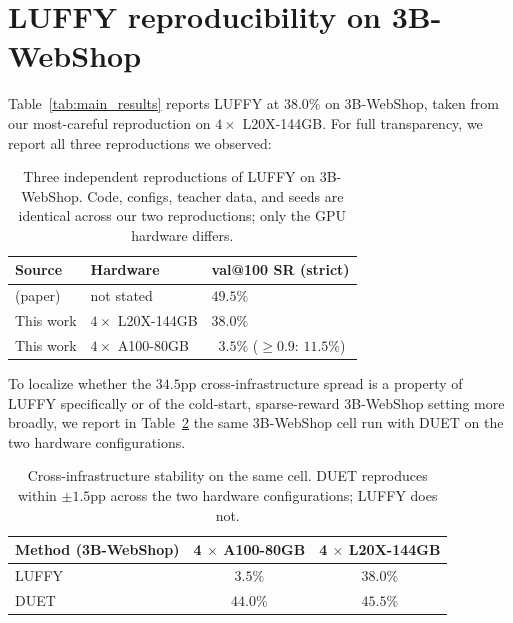 
\section{LUFFY reproducibility on 3B-WebShop}
\label{app:luffy_repro}

Table~\ref{tab:main_results} reports LUFFY at $38.0\%$ on 3B-WebShop, taken from our most-careful reproduction on $4 \times$ L20X-144GB. For full transparency, we report all three reproductions we observed:

\begin{table}[h]
\centering
\small
\begin{tabular}{lll}
\toprule
\textbf{Source} & \textbf{Hardware} & \textbf{val@100 SR (strict)} \\
\midrule
\citet{yan2025luffy} (paper)        & not stated            & $49.5\%$  \\
This work                           & $4 \times$ L20X-144GB & $38.0\%$  \\
This work                           & $4 \times$ A100-80GB  & $\phantom{0}3.5\%$ ($\geq 0.9$: $11.5\%$) \\
\bottomrule
\end{tabular}
\caption{Three independent reproductions of LUFFY on 3B-WebShop. Code, configs, teacher data, and seeds are identical across our two reproductions; only the GPU hardware differs.}
\label{tab:luffy_3way}
\end{table}

To localize whether the $34.5$pp cross-infrastructure spread is a property of LUFFY specifically or of the cold-start, sparse-reward 3B-WebShop setting more broadly, we report in Table~\ref{tab:cross_infra} the same 3B-WebShop cell run with DUET on the two hardware configurations.

\begin{table}[h]
\centering
\small
\begin{tabular}{lcc}
\toprule
\textbf{Method (3B-WebShop)} & \textbf{4 $\times$ A100-80GB} & \textbf{4 $\times$ L20X-144GB} \\
\midrule
LUFFY & \phantom{0}$3.5\%$ & $38.0\%$ \\
DUET  &           $44.0\%$ & $45.5\%$ \\
\bottomrule
\end{tabular}
\caption{Cross-infrastructure stability on the same cell. DUET reproduces within $\pm 1.5$pp across the two hardware configurations; LUFFY does not.}
\label{tab:cross_infra}
\end{table}

